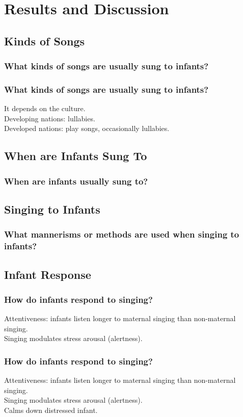 \documentclass{beamer}
\begin{document}
\section{Results and Discussion}
\subsection*{Kinds of Songs}
\begin{frame}
	\frametitle{What kinds of songs are usually sung to infants?}
\end{frame}
\begin{frame}
	\frametitle{What kinds of songs are usually sung to infants?}
	It depends on the culture.\\
	Developing nations: lullabies.\\
	Developed nations: play songs, occasionally lullabies.
\end{frame}

\subsection*{When are Infants Sung To}
\begin{frame}
	\frametitle{When are infants usually sung to?}
\end{frame}

\subsection*{Singing to Infants}
\begin{frame}
	\frametitle{What mannerisms or methods are used when singing to infants?}
\end{frame}

\subsection*{Infant Response}
\begin{frame}
	\frametitle{How do infants respond to singing?}
	Attentiveness: infants listen longer to maternal singing than non-maternal singing.\\
	Singing modulates stress arousal (alertness).
\end{frame}

\begin{frame}
	\frametitle{How do infants respond to singing?}
	Attentiveness: infants listen longer to maternal singing than non-maternal singing.\\
	Singing modulates stress arousal (alertness).\\
	Calms down distressed infant.
\end{frame}
\end{document}
